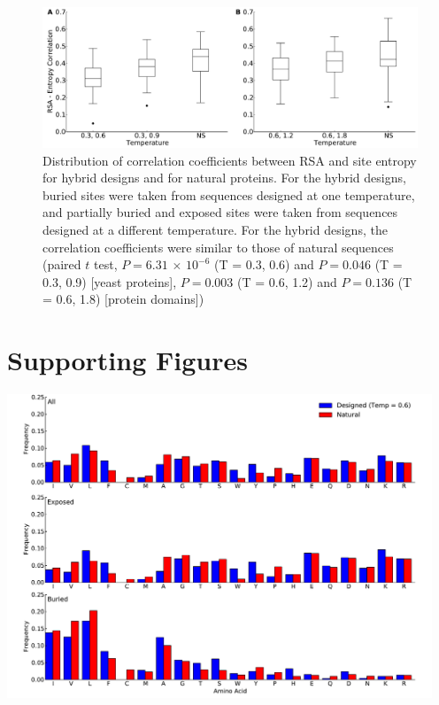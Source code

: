 \documentclass[12pt]{article}
\begin{document}
\begin{figure}[H]
\centerline{\includegraphics[width = 6in]{figures/Combo_Mixed_Temp_Correlation_Plot.pdf}}
\caption{Distribution of correlation coefficients between RSA and site entropy for hybrid designs and for natural proteins. For the hybrid designs, buried sites were taken from sequences designed at one temperature, and partially buried and exposed sites were taken from sequences designed at a different temperature. For the hybrid designs, the correlation coefficients were similar to those of natural sequences (paired $t$ test, $P=  6.31$ $\times$ $10^{-6}$ (T = 0.3, 0.6)  and  $P=0.046$ (T = 0.3, 0.9) [yeast proteins], $P= 0.003$ (T = 0.6, 1.2) and $P= 0.136$ (T = 0.6, 1.8)  [protein domains])}
\label{Mixed_RSA_Entropy}
\end{figure}


\cleardoublepage

\section{Supporting Figures}

\centerline{\includegraphics[width = 5in]{figures/Noah_Freq_Combo_Plots_06.pdf}}
\end{document}

